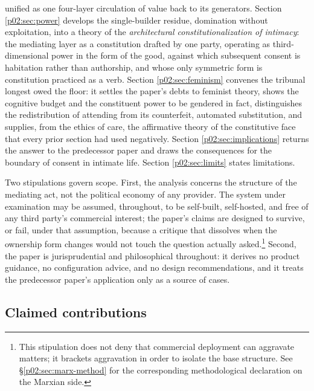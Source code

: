 unified as one four-layer circulation of value back to its generators. Section \ref{p02:sec:power} develops the single-builder residue, domination without exploitation, into a theory of the \emph{architectural constitutionalization of intimacy}: the mediating layer as a constitution drafted by one party, operating as third-dimensional power in the form of the good, against which subsequent consent is habitation rather than authorship, and whose only symmetric form is constitution practiced as a verb. Section \ref{p02:sec:feminism} convenes the tribunal longest owed the floor: it settles the paper's debts to feminist theory, shows the cognitive budget and the constituent power to be gendered in fact, distinguishes the redistribution of attending from its counterfeit, automated substitution, and supplies, from the ethics of care, the affirmative theory of the constitutive face that every prior section had used negatively. Section \ref{p02:sec:implications} returns the answer to the predecessor paper and draws the consequences for the boundary of consent in intimate life. Section \ref{p02:sec:limits} states limitations.

Two stipulations govern scope. First, the analysis concerns the structure of the mediating act, not the political economy of any provider. The system under examination may be assumed, throughout, to be self-built, self-hosted, and free of any third party's commercial interest; the paper's claims are designed to survive, or fail, under that assumption, because a critique that dissolves when the ownership form changes would not touch the question actually asked.\footnote{This stipulation does not deny that commercial deployment can aggravate matters; it brackets aggravation in order to isolate the base structure. See \S\ref{p02:sec:marx-method} for the corresponding methodological declaration on the Marxian side.} Second, the paper is jurisprudential and philosophical throughout: it derives no product guidance, no configuration advice, and no design recommendations, and it treats the predecessor paper's application only as a source of cases.

\subsection{Claimed contributions}
\label{p02:sec:intro-contributions}

